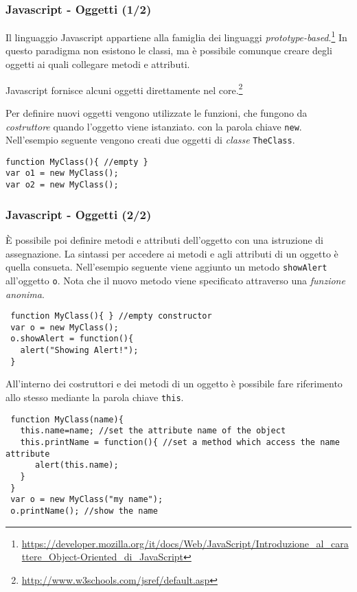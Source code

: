 \documentclass[8pt]{beamer}
\begin{document}
\begin{frame}[fragile]
 \frametitle{Javascript - Oggetti (1/2)}
 Il linguaggio Javascript appartiene alla famiglia dei linguaggi 
 \emph{prototype-based}.\footnote{\url{https://developer.mozilla.org/it/docs/Web/JavaScript/Introduzione_al_carattere_Object-Oriented_di_JavaScript}}
 In questo paradigma non esistono le classi, ma \`e possibile comunque
 creare degli oggetti ai quali collegare metodi e attributi.
 \vspace{\baselineskip}

 Javascript fornisce alcuni oggetti direttamente nel core.\footnote{\url{http://www.w3schools.com/jsref/default.asp}}
 \vspace{\baselineskip}

 Per definire nuovi oggetti vengono utilizzate le funzioni,
 che fungono da \emph{costruttore} quando l'oggetto viene istanziato.
 con la parola chiave \texttt{new}. Nell'esempio 
 seguente vengono creati due oggetti di \emph{classe} \texttt{TheClass}.
 \begin{small}
 \begin{verbatim}
function MyClass(){ //empty }
var o1 = new MyClass();
var o2 = new MyClass();
 \end{verbatim}
 \end{small}
 
\end{frame}

\begin{frame}[fragile]
 \frametitle{Javascript - Oggetti (2/2)}
 
 \`E possibile poi definire metodi e attributi dell'oggetto
 con una istruzione di assegnazione. La sintassi per accedere ai 
 metodi e agli attributi di un oggetto \`e quella consueta. Nell'esempio
 seguente viene aggiunto un metodo \texttt{showAlert} all'oggetto \texttt{o}.
 Nota che il nuovo metodo viene specificato attraverso una \emph{funzione 
 anonima}.

 \begin{small}
 \begin{verbatim}
 function MyClass(){ } //empty constructor
 var o = new MyClass();
 o.showAlert = function(){
   alert("Showing Alert!");
 } 
 \end{verbatim}
 \end{small}
 
 All'interno dei costruttori e dei metodi 
 di un oggetto \`e possibile fare riferimento 
 allo stesso mediante la parola chiave \texttt{this}.
 \begin{small}
 \begin{verbatim}
 function MyClass(name){ 
   this.name=name; //set the attribute name of the object
   this.printName = function(){ //set a method which access the name attribute
      alert(this.name);
   }
 }
 var o = new MyClass("my name");
 o.printName(); //show the name
 \end{verbatim}
 \end{small}
\end{frame}
\end{document}
